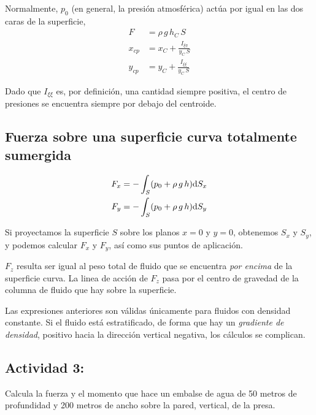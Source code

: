Normalmente, $p_{0}$ (en general, la presión atmosférica) actúa por
igual en las dos caras de la superficie, 
\begin{align*}
F & =\rho\,g\,h_{C}\,S\\
x_{cp} & =x_{C}+\frac{I_{\xi\eta}}{y_{C}\,S}\\
y_{cp} & =y_{C}+\frac{I_{\xi\xi}}{y_{C}\,S}
\end{align*}

Dado que $I_{\xi\xi}$ es, por definición, una cantidad siempre positiva,
el centro de presiones se encuentra siempre por debajo del centroide.


\subsection{Fuerza sobre una superficie curva totalmente sumergida}


\begin{center}
\resizebox{!}{5cm}{}
\par\end{center}

 
\[
\begin{aligned}F_{x} & =-\int_{S}(p_{0}+\rho\,g\,h)\text{d} S_{x}\\
F_{y} & =-\int_{S}(p_{0}+\rho\,g\,h)\text{d} S_{y}
\end{aligned}
\]
 

Si proyectamos la superficie $S$ sobre los planos $x=0$ y $y=0$,
obtenemos $S_{x}$ y $S_{y}$, y podemos calcular $F_{x}$ y $F_{y}$,
así como sus puntos de aplicación.

$F_{z}$ resulta ser igual al peso total de fluido que se encuentra
\emph{por encima} de la superficie curva. La linea de acción de $F_{z}$
pasa por el centro de gravedad de la columna de fluido que hay sobre
la superficie.

Las expresiones anteriores son válidas únicamente para fluidos con
densidad constante. Si el fluido está estratificado, de forma que
hay un \textit{gradiente de densidad}, positivo hacia la dirección
vertical negativa, los cálculos se complican.


\subsection*{Actividad 3:}
Calcula la fuerza y el momento que hace un embalse de agua de 50
metros de profundidad y 200 metros de ancho sobre la pared, vertical,
de la presa.

